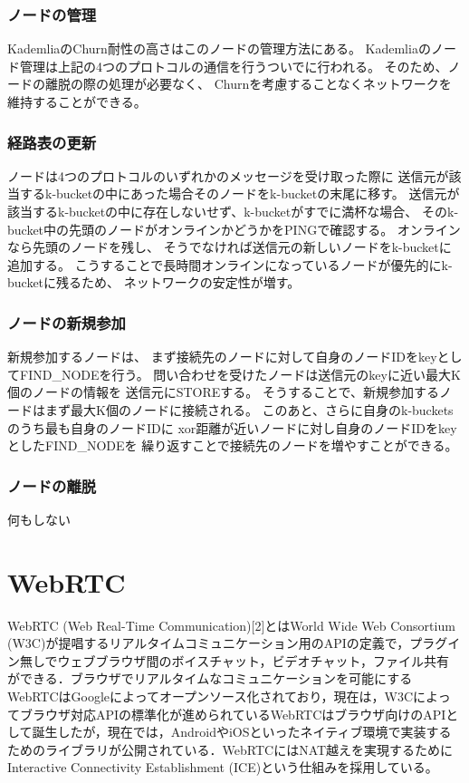 \documentclass[sotsuron]{jcsie}
\begin{document}
\subsubsection{ノードの管理}
KademliaのChurn耐性の高さはこのノードの管理方法にある。
Kademliaのノード管理は上記の4つのプロトコルの通信を行うついでに行われる。
そのため、ノードの離脱の際の処理が必要なく、
Churnを考慮することなくネットワークを維持することができる。
\subsubsection{経路表の更新}
ノードは4つのプロトコルのいずれかのメッセージを受け取った際に
送信元が該当するk-bucketの中にあった場合そのノードをk-bucketの末尾に移す。
送信元が該当するk-bucketの中に存在しないせず、k-bucketがすでに満杯な場合、
そのk-bucket中の先頭のノードがオンラインかどうかをPINGで確認する。
オンラインなら先頭のノードを残し、
そうでなければ送信元の新しいノードをk-bucketに追加する。
こうすることで長時間オンラインになっているノードが優先的にk-bucketに残るため、
ネットワークの安定性が増す。
\subsubsection{ノードの新規参加}
新規参加するノードは、
まず接続先のノードに対して自身のノードIDをkeyとしてFIND\_NODEを行う。
問い合わせを受けたノードは送信元のkeyに近い最大K個のノードの情報を
送信元にSTOREする。
そうすることで、新規参加するノードはまず最大K個のノードに接続される。
このあと、さらに自身のk-bucketsのうち最も自身のノードIDに
xor距離が近いノードに対し自身のノードIDをkeyとしたFIND\_NODEを
繰り返すことで接続先のノードを増やすことができる。
\subsubsection{ノードの離脱}
何もしない

\section{WebRTC}
WebRTC (Web Real-Time Communication)[2]とはWorld Wide Web Consortium
(W3C)が提唱するリアルタイムコミュニケーション用のAPIの定義で，プラグイ
ン無しでウェブブラウザ間のボイスチャット，ビデオチャット，ファイル共有
ができる．ブラウザでリアルタイムなコミュニケーションを可能にする
WebRTCはGoogleによってオープンソース化されており，現在は，W3Cによっ
てブラウザ対応APIの標準化が進められているWebRTCはブラウザ向けのAPIと
して誕生したが，現在では，AndroidやiOSといったネイティブ環境で実装する
ためのライブラリが公開されている．WebRTCにはNAT越えを実現するために
Interactive Connectivity Establishment (ICE)という仕組みを採用している。
\end{document}
